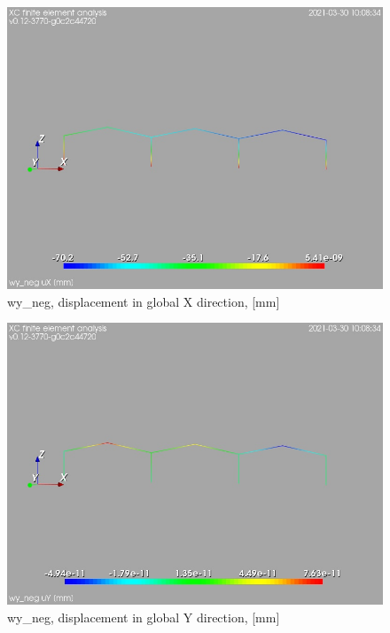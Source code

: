 \cleardoublepage
\begin{figure}
\begin{center}
\includegraphics[width=\linewidth]{calc_results/sole_zeinali/text/graphics/resSimplLC/wy_negtotaluX}
\caption{wy_neg, displacement in global X direction, [mm]}
\end{center}
\end{figure}
\begin{figure}
\begin{center}
\includegraphics[width=\linewidth]{calc_results/sole_zeinali/text/graphics/resSimplLC/wy_negtotaluY}
\caption{wy_neg, displacement in global Y direction, [mm]}
\end{center}
\end{figure}
